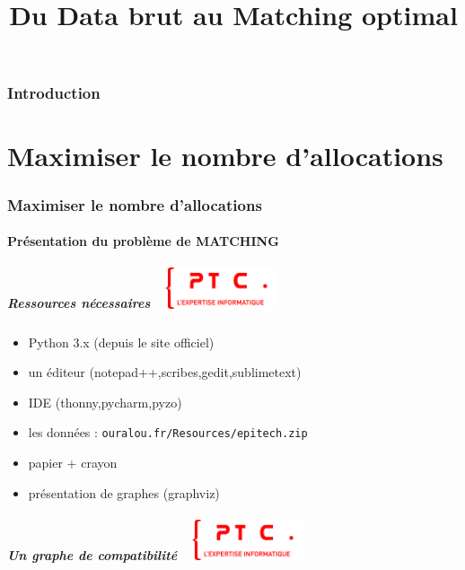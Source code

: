 \documentclass[11pt]{beamer}
\title{Du Data brut au Matching optimal}
\author{}
\date{}
\newenvironment{slide}[1]{%
\begin{frame}[environment=slide]
\frametitle{#1~\hfill~\includegraphics[height=1.2cm]{./epitech.png}}
}{%
\end{frame}
}
\begin{document}
\section{Introduction}

\part{Maximiser le nombre d'allocations}

\section{Maximiser le nombre d'allocations}

\subsection{Présentation du problème de MATCHING}

\begin{slide}{Ressources nécessaires}

\begin{itemize}
	\item Python 3.x (depuis le site officiel)
	\item un éditeur (notepad++,scribes,gedit,sublimetext)
	\item IDE (thonny,pycharm,pyzo)
	\item les données : \texttt{ouralou.fr/Resources/epitech.zip}
	\item papier + crayon
	\item présentation de graphes (graphviz)
\end{itemize}

\end{slide}

\begin{slide}{Un graphe de compatibilité}


\end{slide}
\end{document}
